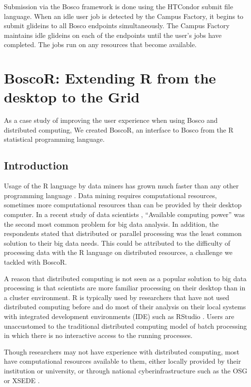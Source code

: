 Submission via the Bosco framework is done using the HTCondor submit file language.  When an idle user job is detected by the Campus Factory, it begins to submit glideins to all Bosco endpoints simultaneously.  The Campus Factory maintains idle glideins on each of the endpoints until the user's jobs have completed.  The jobs run on any resources that become available.


\section{BoscoR: Extending R from the desktop to the Grid}

As a case study of improving the user experience when using Bosco and distributed computing, We created BoscoR, an interface to Bosco from the R statistical programming language.  %


\subsection{Introduction}
Usage of the R language \cite{team2012r} by data miners has grown much faster than any other programming language \cite{rexer2013, KDnuggets2013}.  Data mining requires computational resources, sometimes more computational resources than can be provided by their desktop computer.  In a recent study of data scientists \cite{rexer2013}, ``Available computing power'' was the second most common problem for big data analysis.  In addition, the respondents stated that distributed or parallel processing was the least common solution to their big data needs.  This could be attributed to the difficulty of processing data with the R language on distributed resources, a challenge we tackled with BoscoR.

A reason that distributed computing is not seen as a popular solution to big data processing is that scientists are more familiar processing on their desktop than in a cluster environment.  R is typically used by researchers that have not used distributed computing before and do most of their analysis on their local systems with integrated development environments (IDE) such as RStudio \cite{racine2012rstudio}.  Users are unaccustomed to the traditional distributed computing model of batch processing in which there is no interactive access to the running processes.

Though researchers may not have experience with distributed computing, most have computational resources available to them, either locally provided by their institution or university, or through national cyberinfrastructure such as the OSG \cite{pordes2007open} or XSEDE \cite{xsede}.



